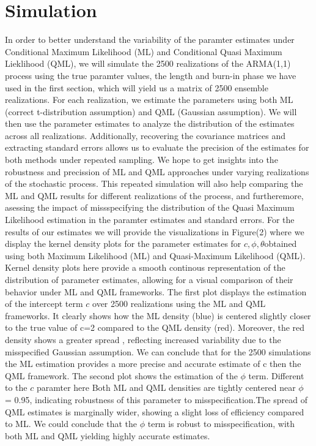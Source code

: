 \documentclass[a4paper,12pt]{article}
\begin{document}
\section{Simulation}
In order to better understand the variability of the paramter estimates under Conditional Maximum Likelihood (ML) and Conditional Quasi Maximum Lieklihood (QML), we will simulate the 2500 realizations of the ARMA(1,1) process using the true paramter values, the length and burn-in phase we have used in the first section, which will yield us a matrix of 2500 ensemble realizations.
For each realization, we estimate the parameters using both ML (correct t-distribution assumption) and QML (Gaussian assumption).
We will then use the parameter estimates to analyze the distribution of the estimates across all realizations. 
Additionally, recovering the covariance matrices and extracting standard errors allows us to evaluate the precision of the estimates for both methods under repeated sampling. We hope to get insights into the robustness and precission of ML and QML approaches under varying realizations of the stochastic process.
This repeated simulation will also help comparing the ML and QML results for different realizations of the process, and furtheremore, asessing the impact of missspecifying the distribution of the Quasi Maximum Likelihood estimation in the paramter estimates and standard errors.
For the results of our estimates we will provide the visualizations in Figure(2) where we display the kernel density plots for the parameter estimates for $c, \phi,\theta$obtained using both Maximum Likelihood (ML) and Quasi-Maximum Likelihood (QML). 
Kernel density plots here provide a smooth continous representation of the distribution of parameter estimates, allowing for a visual comparison of their behavior under ML and QML frameworks.
The first plot displays the estimation of the intercept term $c$ over 2500 realizations using the ML and QML frameworks. It clearly shows how the ML density (blue) is centered slightly closer to the true value of c=2 compared to the QML density (red). Moreover, the red density shows a greater spread , reflecting increased variability due to the misspecified Gaussian assumption.
We can conclude that for the 2500 simulations the ML estimation provides a more precise and accurate estimate of c then the QML framework. 
The second plot shows the estimation of the $\phi$ term. Different to the $c$ paramter here Both ML and QML densities are tightly centered near $\phi$ = 0.95, indicating robustness of this parameter to misspecification.The spread of QML estimates is marginally wider, showing a slight loss of efficiency compared to ML. We could conclude that the $\phi$ term is robust to misspecification, with both ML and QML yielding highly accurate estimates.
\end{document}
